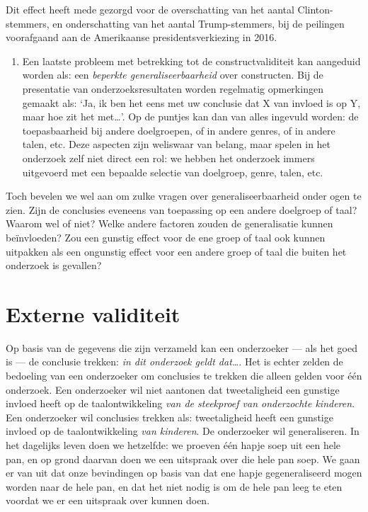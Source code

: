 \documentclass[
]{book}
\providecommand{\tightlist}{%
  \setlength{\itemsep}{0pt}\setlength{\parskip}{0pt}}
\begin{document}
Dit effect heeft mede gezorgd voor de overschatting van het aantal
Clinton-stemmers, en onderschatting van het aantal Trump-stemmers, bij
de peilingen voorafgaand aan de Amerikaanse presidentsverkiezing in
2016.

\begin{enumerate}
\def\labelenumi{\arabic{enumi}.}
\setcounter{enumi}{6}
\tightlist
\item
  Een laatste probleem met betrekking tot de constructvaliditeit kan
  aangeduid worden als: een \emph{beperkte generaliseerbaarheid} over
  constructen. Bij de presentatie van onderzoeksresultaten worden
  regelmatig opmerkingen gemaakt als: `Ja, ik ben het eens met uw
  conclusie dat X van invloed is op Y, maar hoe zit het met\ldots{}'. Op de
  puntjes kan dan van alles ingevuld worden: de toepasbaarheid bij andere
  doelgroepen, of in andere genres, of in andere talen, etc. Deze aspecten
  zijn weliswaar van belang, maar spelen in het onderzoek zelf niet direct
  een rol: we hebben het onderzoek immers uitgevoerd met een bepaalde
  selectie van doelgroep, genre, talen, etc.
\end{enumerate}

Toch bevelen we wel aan om zulke vragen over generaliseerbaarheid onder
ogen te zien. Zijn de conclusies eveneens van toepassing op een andere
doelgroep of taal? Waarom wel of niet? Welke andere factoren zouden de
generalisatie kunnen beïnvloeden? Zou een gunstig effect voor de ene
groep of taal ook kunnen uitpakken als een ongunstig effect voor een
andere groep of taal die buiten het onderzoek is gevallen?

\hypertarget{sec:externevaliditeit}{%
\section{Externe validiteit}\label{sec:externevaliditeit}}

Op basis van de gegevens die zijn verzameld kan een onderzoeker --- als
het goed is --- de conclusie trekken: \emph{in dit onderzoek geldt dat\ldots{}}.
Het is echter zelden de bedoeling van een onderzoeker om conclusies te
trekken die alleen gelden voor één onderzoek. Een onderzoeker wil niet
aantonen dat tweetaligheid een gunstige invloed heeft op de
taalontwikkeling \emph{van de steekproef van onderzochte kinderen}. Een
onderzoeker wil conclusies trekken als: tweetaligheid heeft een gunstige
invloed op de taalontwikkeling \emph{van kinderen}. De onderzoeker wil
generaliseren. In het dagelijks leven doen we hetzelfde: we proeven één
hapje soep uit een hele pan, en op grond daarvan doen we een uitspraak
over die hele pan soep. We gaan er van uit dat onze bevindingen op basis
van dat ene hapje gegeneraliseerd mogen worden naar de hele pan, en dat
het niet nodig is om de hele pan leeg te eten voordat we er een
uitspraak over kunnen doen.
\end{document}
